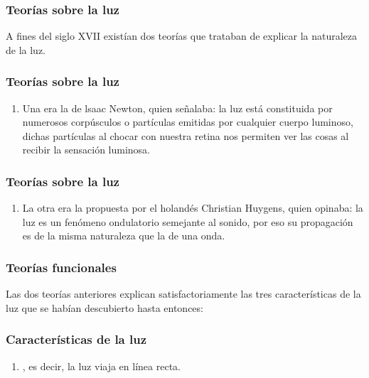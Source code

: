 \documentclass[14pt]{beamer}
\begin{document}
\begin{frame}
\frametitle{Teorías sobre la luz}
A fines del siglo XVII existían dos teorías que trataban de explicar la naturaleza de la luz.
\end{frame}
\begin{frame}
\frametitle{Teorías sobre la luz}
\begin{enumerate}[<+->]
\item Una era la  de lsaac Newton, quien señalaba: \pause la luz está constituida por numerosos corpúsculos o partículas emitidas por cualquier cuerpo luminoso, dichas partículas al chocar con nuestra retina nos permiten ver las cosas al recibir la sensación luminosa.
\seti
\end{enumerate}
\end{frame}
\begin{frame}
\frametitle{Teorías sobre la luz}
\begin{enumerate}[<+->]
\conti
\item La otra era la  propuesta por el holandés Christian Huygens, quien opinaba: \pause la luz es un fenómeno ondulatorio semejante al sonido, por eso su propagación es de la misma naturaleza que la de una onda.
\end{enumerate}
\end{frame}
\begin{frame}
\frametitle{Teorías funcionales}
Las dos teorías anteriores explican satisfactoriamente las tres características de la luz que se habían descubierto hasta entonces:
\end{frame}
\begin{frame}
\frametitle{Características de la luz}
\begin{enumerate}[<+->]
\item {}, \pause es decir, la luz viaja en línea recta.
\seti
\end{enumerate}
\end{frame}
\end{document}
